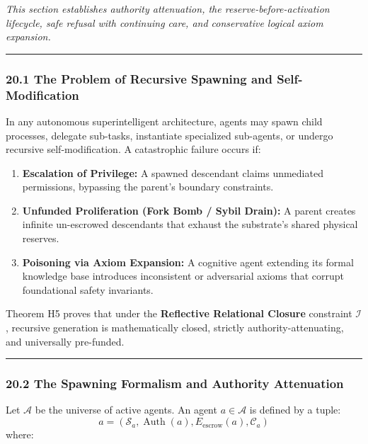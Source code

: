 \documentclass[
]{article}
\providecommand{\tightlist}{%
  \setlength{\itemsep}{0pt}\setlength{\parskip}{0pt}}
\begin{document}
\emph{This section establishes authority attenuation, the
reserve-before-activation lifecycle, safe refusal with continuing care,
and conservative logical axiom expansion.}

\begin{center}\rule{0.5\linewidth}{0.5pt}\end{center}

\subsubsection{20.1 The Problem of Recursive Spawning and
Self-Modification}\label{the-problem-of-recursive-spawning-and-self-modification}

In any autonomous superintelligent architecture, agents may spawn child
processes, delegate sub-tasks, instantiate specialized sub-agents, or
undergo recursive self-modification. A catastrophic failure occurs if:

\begin{enumerate}
\def\labelenumi{\arabic{enumi}.}
\tightlist
\item
  \textbf{Escalation of Privilege:} A spawned descendant claims
  unmediated permissions, bypassing the parent's boundary constraints.
\item
  \textbf{Unfunded Proliferation (Fork Bomb / Sybil Drain):} A parent
  creates infinite un-escrowed descendants that exhaust the substrate's
  shared physical reserves.
\item
  \textbf{Poisoning via Axiom Expansion:} A cognitive agent extending
  its formal knowledge base introduces inconsistent or adversarial
  axioms that corrupt foundational safety invariants.
\end{enumerate}

Theorem H5 proves that under the \textbf{Reflective Relational Closure}
constraint \(\mathcal{I}\), recursive generation is mathematically
closed, strictly authority-attenuating, and universally pre-funded.

\begin{center}\rule{0.5\linewidth}{0.5pt}\end{center}

\subsubsection{20.2 The Spawning Formalism and Authority
Attenuation}\label{the-spawning-formalism-and-authority-attenuation}

Let \(\mathcal{A}\) be the universe of active agents. An agent
\(a \in \mathcal{A}\) is defined by a tuple:
\[a = \left(\mathcal{S}_a, \operatorname{Auth}(a), E_{\mathrm{escrow}}(a), \mathcal{C}_a\right)\]
where:
\end{document}
